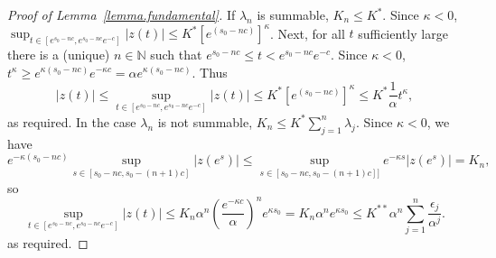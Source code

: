 \documentclass[a4paper,10pt,reqno]{amsart}
\numberwithin{equation}{section}
\theoremstyle{definition}
\theoremstyle{remark}
\DeclareMathOperator{\1}{\mathbbm 1}
\begin{document}
\begin{proof}[Proof of Lemma~\ref{lemma.fundamental}]
If $\lambda_n$ is summable, $K_n\leq K^\ast$. Since $\kappa<0$,  
$\sup_{t\in [e^{s_0-nc},e^{s_0-nc}e^{-c}]} |z(t)|\leq K^\ast [e^{(s_0-nc)}]^\kappa$. Next, for all $t$ sufficiently large there is a (unique) $n\in \mathbb{N}$ such that 
$e^{s_0-nc}\leq t<e^{s_0-nc}e^{-c}$. Since $\kappa<0$, $t^\kappa\geq e^{\kappa(s_0-nc)}e^{-\kappa c} = \alpha e^{\kappa(s_0-nc)}$. Thus
\[
|z(t)|\leq \sup_{t\in [e^{s_0-nc},e^{s_0-nc}e^{-c}]} |z(t)|\leq 
K^\ast [e^{(s_0-nc)}]^\kappa \leq K^\ast \frac{1}{\alpha} t^\kappa,
\]
as required. In the case $\lambda_n$ is not summable, $K_n\leq K^\ast \sum_{j=1}^n \lambda_j$. Since $\kappa<0$, we have 
\[
e^{-\kappa(s_0-nc)}\sup_{s\in [s_0-nc,s_0-(n+1)c]} |z(e^s)|
\leq \sup_{s\in [s_0-nc,s_0-(n+1)c]]} e^{-\kappa s} |z(e^s)|= K_n,
\]
so 
\[
\sup_{t\in [e^{s_0-nc},e^{s_0-nc}e^{-c}]} |z(t)|\leq K_n \alpha^n 
\left(\frac{e^{-\kappa c}}{\alpha}\right)^n e^{\kappa s_0} 
= K_n \alpha^n  e^{\kappa s_0}
\leq K^{\ast\ast} \alpha^n \sum_{j=1}^n \frac{\epsilon_j}{\alpha^j}.
\]
as required. 
\end{proof}
\end{document}
